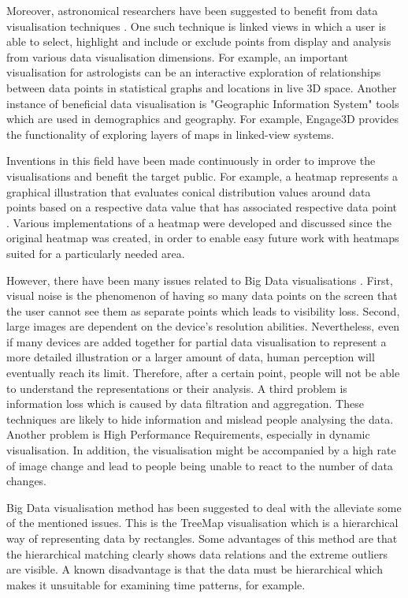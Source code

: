 \documentclass{l4proj}
\begin{document}
Moreover, astronomical researchers have been suggested to benefit from data visualisation techniques \cite{goodman2012principles}. One such technique is linked views in which a user is able to select, highlight and include or exclude points from display and analysis from various data visualisation dimensions. For example, an important visualisation for astrologists can be an interactive exploration of relationships between data points in statistical graphs and locations in live 3D space. Another instance of beneficial data visualisation is "Geographic Information System" tools which are used in demographics and geography. For example, Engage3D provides the functionality of exploring layers of maps in linked-view systems. 

Inventions in this field have been made continuously in order to improve the visualisations and benefit the target public. For example, a heatmap represents a graphical illustration that evaluates conical distribution values around data points based on a respective data value that has associated respective data point \cite{cardno2014data}. Various implementations of a heatmap were developed and discussed since the original heatmap was created, in order to enable easy future work with heatmaps suited for a particularly needed area.

However, there have been many issues related to Big Data visualisations \cite{gorodov2013analytical}. First, visual noise is the phenomenon of having so many data points on the screen that the user cannot see them as separate points which leads to visibility loss. Second, large images are dependent on the device's resolution abilities. Nevertheless, even if many devices are added together for partial data visualisation to represent a more detailed illustration or a larger amount of data, human perception will eventually reach its limit. Therefore, after a certain point, people will not be able to understand the representations or their analysis. A third problem is information loss which is caused by data filtration and aggregation. These techniques are likely to hide information and mislead people analysing the data. Another problem is High Performance Requirements, especially in dynamic visualisation. In addition, the visualisation might be accompanied by a high rate of image change and lead to people being unable to react to the number of data changes. 

Big Data visualisation method has been suggested  to deal with the alleviate some of the mentioned issues. This is the TreeMap visualisation \cite{gorodov2013analytical} which is a hierarchical way of representing data by rectangles. Some advantages of this method are that the hierarchical matching clearly shows data relations and the extreme outliers are visible. A known  disadvantage is that the data must be hierarchical which makes it unsuitable for examining time patterns, for example. 
\end{document}
